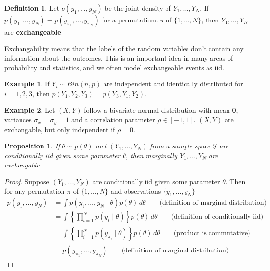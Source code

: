 \documentclass[
]{book}
\newtheorem{proposition}{Proposition}[chapter]
\theoremstyle{definition}
\newtheorem{definition}{Definition}[chapter]
\theoremstyle{definition}
\newtheorem{example}{Example}[chapter]
\theoremstyle{definition}
\theoremstyle{definition}
\theoremstyle{remark}
\begin{document}
\begin{definition}
Let \(p(y_1, \ldots, y_N)\) be the joint density of \(Y_1, \ldots, Y_N\). If \(p(y_1, \ldots, y_N) = p(y_{\pi_1}, \ldots, y_{\pi_N})\) for a permutations \(\pi\) of \(\{1, \ldots, N\}\), then \(Y_1, \ldots, Y_N\) are \textbf{exchangeable}.
\end{definition}

Exchangability means that the labels of the random variables don't contain any information about the outcomes. This is an important idea in many areas of probability and statistics, and we often model exchangeable events as iid.

\begin{example}
If \(Y_i \sim Bin(n, p)\) are independent and identically distributed for \(i = 1, 2, 3\), then \(p(Y_1, Y_2, Y_3) = p(Y_3, Y_1, Y_2)\).
\end{example}

\begin{example}
Let \((X, Y)\) follow a bivariate normal distribution with mean \textbf{0}, variances \(\sigma_x = \sigma_y = 1\) and a correlation parameter \(\rho \in [-1, 1]\). \((X, Y)\) are exchangable, but only independent if \(\rho = 0\).
\end{example}

\begin{proposition}
If \(\theta \sim p(\theta)\) and \((Y_1, \ldots, Y_N)\) from a sample space \(\mathcal{Y}\) are conditionally iid given some parameter \(\theta\), then marginally \(Y_1, \ldots, Y_N\) are exchangable.
\end{proposition}

\begin{proof}
Suppose \((Y_1, \ldots, Y_N)\) are conditionally iid given some parameter \(\theta\). Then for any permutation \(\pi\) of \(\{1, \ldots, N\}\) and observations \(\{y_1, \ldots, y_N\}\)
\begin{equation}
\begin{split}
p(y_1, \ldots, y_N) &= \int p(y_1, \ldots, y_N \mid \theta) p(\theta)\, d\theta \qquad \textrm{(definition of marginal distribution)}\\
 & = \int \left\{\prod_{i=1}^Np(y_i \mid \theta)\right\} p(\theta)\, d\theta \qquad \textrm{(definition of conditionally iid)}\\
& = \int \left\{\prod_{i=1}^Np(y_{\pi_i} \mid \theta)\right\} p(\theta)\, d\theta \qquad \textrm{(product is commutative)} \\
 & = p(y_{\pi_1}, \ldots, y_{\pi_N}) \qquad \textrm{(definition of marginal distribution)}
\end{split}
\end{equation}
\end{proof}
\end{document}
